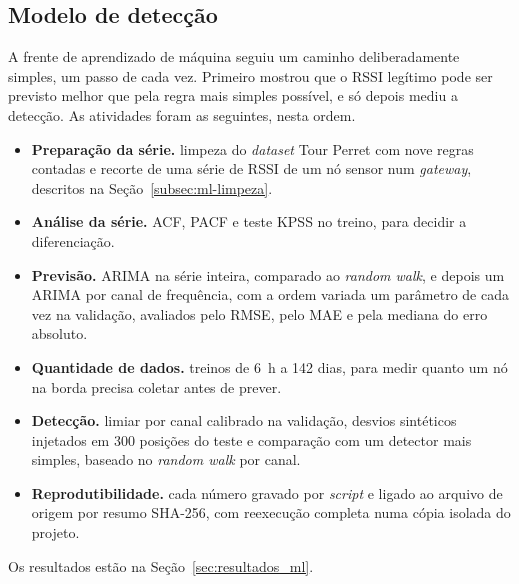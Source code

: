 \subsection{Modelo de detecção}

A frente de aprendizado de máquina seguiu um caminho deliberadamente simples,
um passo de cada vez. Primeiro mostrou que o RSSI legítimo pode ser previsto
melhor que pela regra mais simples possível, e só depois mediu a detecção. As
atividades foram as seguintes, nesta ordem.

\begin{itemize}
    \item \textbf{Preparação da série.} limpeza do \textit{dataset} Tour Perret
    com nove regras contadas e recorte de uma série de RSSI de um nó sensor num
    \textit{gateway}, descritos na Seção~\ref{subsec:ml-limpeza}.

    \item \textbf{Análise da série.} ACF, PACF e teste KPSS no treino, para
    decidir a diferenciação.

    \item \textbf{Previsão.} ARIMA na série inteira, comparado ao
    \textit{random walk}, e depois um ARIMA por canal de frequência, com a
    ordem variada um parâmetro de cada vez na validação, avaliados pelo RMSE,
    pelo MAE e pela mediana do erro absoluto.

    \item \textbf{Quantidade de dados.} treinos de 6~h a 142 dias, para medir
    quanto um nó na borda precisa coletar antes de prever.

    \item \textbf{Detecção.} limiar por canal calibrado na validação, desvios
    sintéticos injetados em 300 posições do teste e comparação com um detector
    mais simples, baseado no \textit{random walk} por canal.

    \item \textbf{Reprodutibilidade.} cada número gravado por \textit{script} e
    ligado ao arquivo de origem por resumo SHA-256, com reexecução completa numa
    cópia isolada do projeto.
\end{itemize}

Os resultados estão na Seção~\ref{sec:resultados_ml}.

